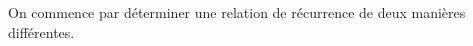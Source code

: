 \documentclass[a4paper,10pt]{report}
\begin{document}
\begin{preuve} On commence par déterminer une relation de récurrence de deux manières différentes. 

%

\end{preuve}
\end{document}
